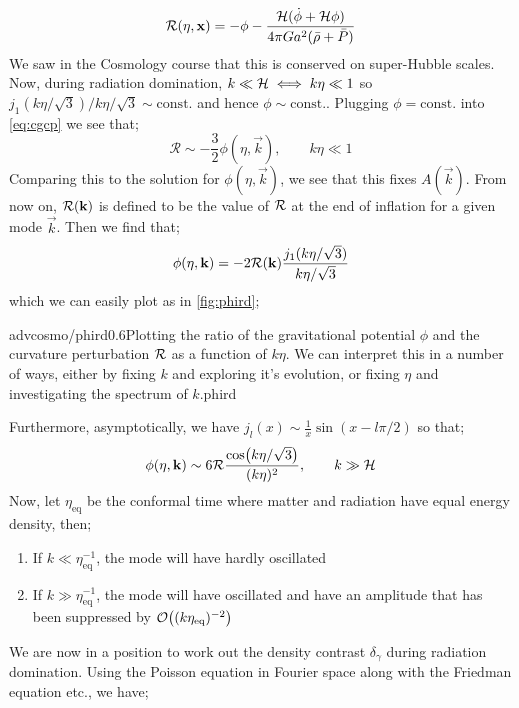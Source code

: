 \begin{equation}
\label{eq:cgcp}
\mathcal{R}(\eta, \mathbf{x}) = -\phi - \frac{\mathcal{H} (\dot{\phi} + \mathcal{H} \phi)}{4\pi G a^2 (\bar{\rho} + \bar{P})}
\end{equation}
We saw in the Cosmology course that this is conserved on super-Hubble scales. Now, during radiation domination, $k \ll \mathcal{H} \iff k\eta \ll 1$ so $j_1(k\eta/\sqrt{3})/k\eta/\sqrt{3} \sim \text{const.}$ and hence $\phi \sim \text{const.}$. Plugging $\phi = \text{const.}$ into \eqref{eq:cgcp} we see that;
\begin{equation*}
\mathcal{R} \sim -\frac{3}{2}\phi(\eta, \vec{k}) , \qquad k \eta \ll 1
\end{equation*}
Comparing this to the solution for $\phi(\eta, \vec{k})$, we see that this fixes $A(\vec{k})$. From now on, $\mathcal{R}(\mathbf{k})$ is defined to be the value of $\mathcal{R}$ at the end of inflation for a given mode $\vec{k}$. Then we find that;
\begin{equation}
\phi(\eta, \mathbf{k}) = - 2 \mathcal{R}(\mathbf{k})\frac{j_1(k\eta / \sqrt{3})}{k\eta / \sqrt{3}}
\end{equation}
which we can easily plot as in \autoref{fig:phird};
\begin{mygraphic}{advcosmo/phird}{0.6}{Plotting the ratio of the gravitational potential $\phi$ and the curvature perturbation $\mathcal{R}$ as a function of $k\eta$. We can interpret this in a number of ways, either by fixing $k$ and exploring it's evolution, or fixing $\eta$ and investigating the spectrum of $k$.}{phird}\end{mygraphic}
Furthermore, asymptotically, we have $j_l(x) \sim \tfrac{1}{x}\sin(x - l\pi/2)$ so that;
\begin{equation}
\phi(\eta, \mathbf{k}) \sim 6\mathcal{R} \frac{\cos(k\eta/\sqrt{3})}{(k\eta)^2}, \qquad k \gg \mathcal{H}
\end{equation}
Now, let $\eta_{\text{eq}}$ be the conformal time where matter and radiation have equal energy density, then;
\begin{enumerate}
\item If $k \ll \eta_{\text{eq}}^{-1}$, the mode will have hardly oscillated
\item If $k \gg \eta_{\text{eq}}^{-1}$, the mode will have oscillated and have an amplitude that has been suppressed by $\mO\left((k\eta_{\text{eq}})^{-2}\right)$
\end{enumerate}
We are now in a position to work out the density contrast $\delta_\gamma$ during radiation domination. Using the Poisson equation in Fourier space along with the Friedman equation etc., we have;
